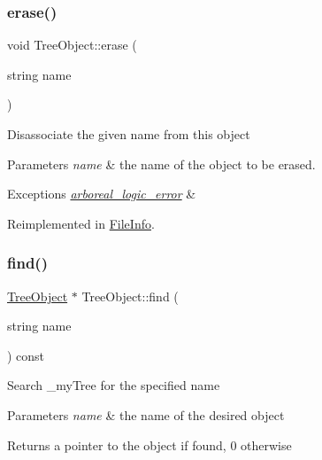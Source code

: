\subsubsection{\texorpdfstring{erase()}{erase()}}
{\footnotesize\ttfamily void Tree\+Object\+::erase (\begin{DoxyParamCaption}\item[{string}]{name }\end{DoxyParamCaption})\hspace{0.3cm}{\ttfamily [virtual]}}

Disassociate the given name from this object 
\begin{DoxyParams}{Parameters}
{\em name} & the name of the object to be erased. \\
\hline
\end{DoxyParams}

\begin{DoxyExceptions}{Exceptions}
{\em \mbox{\hyperlink{classarboreal__logic__error}{arboreal\+\_\+logic\+\_\+error}}} & \\
\hline
\end{DoxyExceptions}


Reimplemented in \mbox{\hyperlink{classFileInfo_ae058242283d3317eaf2b79428e6137f6}{File\+Info}}.

\mbox{\label{classTreeObject_a6a7477c29a06a9896df549f83611252f}} 
\subsubsection{\texorpdfstring{find()}{find()}}
{\footnotesize\ttfamily \mbox{\hyperlink{classTreeObject}{Tree\+Object}} $\ast$ Tree\+Object\+::find (\begin{DoxyParamCaption}\item[{string}]{name }\end{DoxyParamCaption}) const}

Search \+\_\+my\+Tree for the specified name 
\begin{DoxyParams}{Parameters}
{\em name} & the name of the desired object \\
\hline
\end{DoxyParams}
\begin{DoxyReturn}{Returns}
a pointer to the object if found, 0 otherwise 
\end{DoxyReturn}
\mbox{\label{classTreeObject_af7841065fe85d0884341d72669185169}} 
